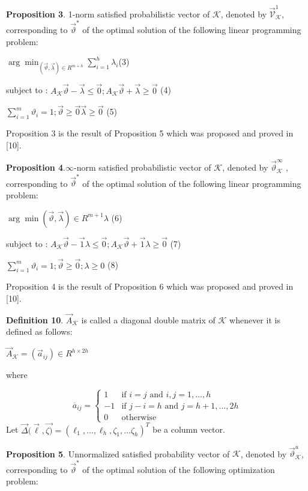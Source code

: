 \documentclass[]{iosart2c}
\begin{document}
\textbf{Proposition 3}. 1-norm satisfied probabilistic vector of $\mathcal{K}$, denoted by $\vec{\mathcal{V}}^1_\mathcal{K}$, corresponding to $\vec{\vartheta}^*$ of the optimal solution of the following linear programming problem:

$\arg \min _{(\vec{\vartheta},\vec{\lambda}) \in R^{m+h}} \sum^h_{i=1}\lambda_i$(3)

subject to : $A_\mathcal{K} \vec{\vartheta} - \vec{\lambda} \le \vec{0}; A_\mathcal{K}\vec{\vartheta} + \vec{\lambda}\geq\vec{0}$ (4)

$\sum^m_{i=1} \vartheta_i = 1; \vec{\vartheta}\geq\vec{0}  	\vec{\lambda}\geq \vec{0}$ (5)

Proposition 3 is the result of Proposition 5 which was proposed and proved in [10].

\textbf{Proposition 4}.$\infty$-norm satisfied probabilistic vector of $\mathcal{K}$, denoted by $\vec{\vartheta}^\infty_\mathcal{K}$ , corresponding to $\vec{\vartheta}^*$ of the optimal solution of the following linear programming problem:

$\arg \min(\vec{\vartheta},\vec{\lambda}) \in R^{m+1}\lambda$ (6)

subject to : $A_\mathcal{K}\vec{\vartheta} -\vec{1}\lambda \le \vec{0}; A_\mathcal{K}\vec{\vartheta} +\vec{1}\lambda \geq \vec{0}$ (7)

$\sum^m_{i=1} \vartheta_i = 1; \vec{\vartheta}\geq\vec{0}; \lambda\geq 0$ (8)

Proposition 4 is the result of Proposition 6 which was proposed and proved in [10].

\textbf{Definition 10}. $\vec{A}_\mathcal{K}$ is called a diagonal double matrix of $\mathcal{K}$ whenever it is defined as follows: 

$\vec{A}_\mathcal{K} = (\vec{a}_{ij}) \in R^{h \times 2h}$

where

$$\overline{a}_{ij} =
\begin{cases}
 1		&\text{if $i = j$ and $i, j = 1, ... , h$}\\
 -1 	&\text{if $j - i = h$ and $j = h + 1, ... , 2h$}\\
 0 		&\text{otherwise}
\end{cases}
$$
Let $\vec{\Delta}(\vec{\ell},\vec{\zeta)} = (\ell_1, ..., \ell_h, \zeta_1, ...\zeta_h)^T$ be a column vector.

\textbf{Proposition 5}. Unnormalized satisfied probability vector of $\mathcal{K}$, denoted by $\vec{\vartheta}^u_\mathcal{K}$, corresponding to $\vec{\vartheta}^*$ of the optimal solution of the following optimization problem:
\end{document}
